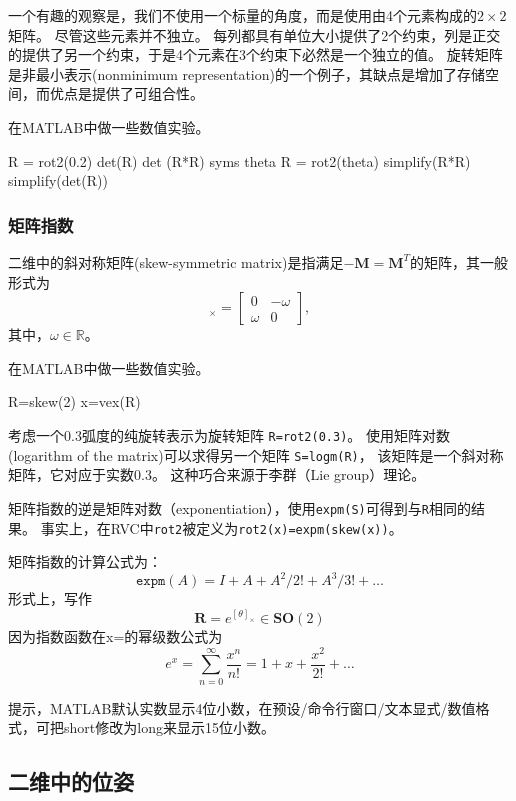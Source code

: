 \documentclass[UTF8,a4paper,10pt]{ctexart}
\begin{document}
一个有趣的观察是，我们不使用一个标量的角度，而是使用由4个元素构成的$2\times2$矩阵。
尽管这些元素并不独立。
每列都具有单位大小提供了2个约束，列是正交的提供了另一个约束，于是4个元素在3个约束下必然是一个独立的值。
旋转矩阵是非最小表示(nonminimum representation)的一个例子，其缺点是增加了存储空间，而优点是提供了可组合性。

在MATLAB中做一些数值实验。
\begin{matlab}
  R = rot2(0.2)
  det(R)
  det (R*R)
  syms theta
  R = rot2(theta)
  simplify(R*R)
  simplify(det(R))
\end{matlab}

\subsubsection{矩阵指数}
二维中的斜对称矩阵(skew-symmetric matrix)是指满足$-\mathbf{M}=\mathbf{M}^T$的矩阵，其一般形式为
\begin{equation}
  [\omega]_{\times}=
  \begin{bmatrix}0&-\omega\\\omega&0\end{bmatrix},
\end{equation}
其中，$\omega\in\mathbb{R}$。

在MATLAB中做一些数值实验。
\begin{matlab}
  R=skew(2)
  x=vex(R)
\end{matlab}

考虑一个$0.3$弧度的纯旋转表示为旋转矩阵 \verb|R=rot2(0.3)|。
使用矩阵对数(logarithm of the matrix)可以求得另一个矩阵 \verb|S=logm(R)|，
该矩阵是一个斜对称矩阵，它对应于实数$0.3$。
这种巧合来源于李群（Lie group）理论。

矩阵指数的逆是矩阵对数（exponentiation），使用\verb|expm(S)|可得到与\verb|R|相同的结果。
事实上，在RVC中\verb|rot2|被定义为\verb|rot2(x)=expm(skew(x))|。

矩阵指数的计算公式为：
$$
\mathtt{expm}(A)=I+A+A^2/2!+A^3/3!+\ldots
$$
形式上，写作
$$
\mathbf{R}=e^{[\theta]_{\times}}\in\mathbf{SO}(2)
$$
因为指数函数在x=的幂级数公式为
$$
e^{x}=\sum_{n=0}^{\infty}\frac{x^n}{n!}=1+x+\frac{x^2}{2!}+\ldots
$$

提示，MATLAB默认实数显示4位小数，在预设/命令行窗口/文本显式/数值格式，可把short修改为long来显示15位小数。

\subsection{二维中的位姿}
\end{document}
